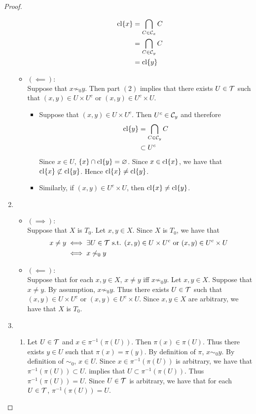 \documentclass{book}
\begin{document}
\begin{proof}
\begin{enumerate}
\begin{itemize}
				\begin{align*}
					\operatorname{cl} \{x\} 
					& = \bigcap_{C \in \mathcal{C}_x} C \\
					& = \bigcap_{C \in \mathcal{C}_y} C \\
					& = \operatorname{cl} \{y\}
				\end{align*}
				\item $(\impliedby):$ \\
				Suppose that $x \not \sim_0 y$. Then part $(2)$ implies that there exists $U \in \mathcal{T}$ such that $(x,y) \in U \times U^c$ or $(x,y) \in U^c \times U$. 
				\begin{itemize}
					\item Suppose that $(x,y) \in U \times U^c$. Then $U^c \in \mathcal{C}_y$ and therefore 
					\begin{align*}
						\operatorname{cl} \{y\}
						& = \bigcap_{C \in \mathcal{C}_y} C \\
						& \subset U^c 
					\end{align*}
					Since $x \in U$, $\{x\} \cap \operatorname{cl} \{y\} = \varnothing$. Since $x \in \operatorname{cl}\{x\}$, we have that $\operatorname{cl} \{x\} \not \subset \operatorname{cl} \{y\}$. Hence $\operatorname{cl} \{x\} \neq \operatorname{cl} \{y\}$.
					\item Similarly, if $(x,y) \in U^c \times U$, then $\operatorname{cl} \{x\} \neq \operatorname{cl} \{y\}$.
				\end{itemize}
			\end{itemize}
			\item 
			\begin{itemize}
				\item $(\implies):$ \\
				Suppose that $X$ is $T_0$. Let $x,y \in X$. Since $X$ is $T_0$, we have that
				\begin{align*}
					x \neq y
					& \iff \exists U \in \mathcal{T} \text{ s.t. $(x,y) \in U \times U^c$ or $(x,y) \in U^c \times U$ } \\
					& \iff x \not \sim_0 y 
				\end{align*}
				\item $(\impliedby):$ \\
				Suppose that for each $x,y \in X$, $x \neq y$ iff $x \not \sim_0 y$. Let $x,y \in X$. Suppose that $x \neq y$. By assumption, $x \not \sim_0 y$. Thus there exists $U \in \mathcal{T}$ such that $(x, y) \in U \times U^c$ or $(x, y) \in U^c \times U$. Since $x,y \in X$ are arbitrary, we have that $X$ is $T_0$.
			\end{itemize}
			\item 
			\begin{enumerate}
				\item Let $U \in \mathcal{T}$ and $x \in \pi^{-1}(\pi(U))$. Then $\pi(x) \in \pi(U)$. Thus there exists $y \in U$ such that $\pi(x) = \pi(y)$. By definition of $\pi$, $x \sim_0 y$. By definition of $\sim_0$, $x \in U$. Since $x \in \pi^{-1}(\pi(U))$ is arbitrary, we have that $\pi^{-1}(\pi(U)) \subset U$.  implies that $U \subset \pi^{-1}(\pi(U))$. Thus $\pi^{-1}(\pi(U)) = U$. Since $U \in \mathcal{T}$ is arbitrary, we have that for each $U \in \mathcal{T}$, $\pi^{-1}(\pi(U)) = U$. 

\end{enumerate}
\end{enumerate}
\end{proof}
\end{document}
